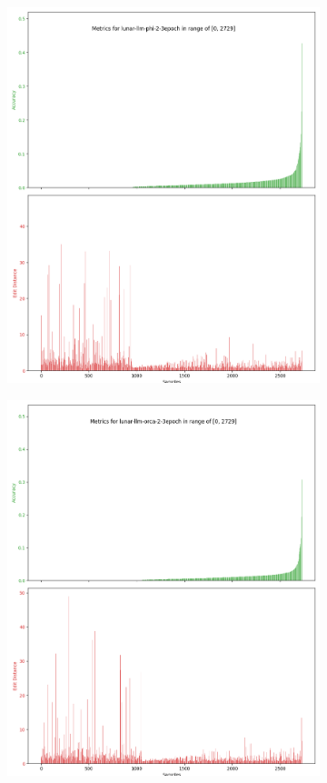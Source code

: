\begin{figure}[ht]
	\centering
	\begin{subfigure}{0.5\textwidth}
		\includegraphics[width=1.0\textwidth]{Immagini/evaluations/lunar-llm-phi-2-3epoch_metrics.png}
	\end{subfigure}%
	\begin{subfigure}{0.5\textwidth}
		\includegraphics[width=1.0\textwidth]{Immagini/evaluations/lunar-llm-orca-2-3epoch_metrics.png}

\end{subfigure}
\end{figure}

